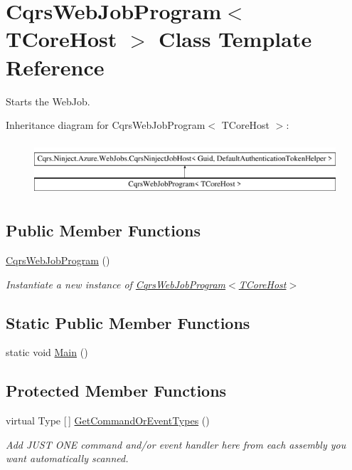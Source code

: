 \hypertarget{classCqrsWebJobProgram}{}\section{Cqrs\+Web\+Job\+Program$<$ T\+Core\+Host $>$ Class Template Reference}
\label{classCqrsWebJobProgram}


Starts the Web\+Job.  


Inheritance diagram for Cqrs\+Web\+Job\+Program$<$ T\+Core\+Host $>$\+:\begin{figure}[H]
\begin{center}
\leavevmode
\includegraphics[height=2.000000cm]{classCqrsWebJobProgram}
\end{center}
\end{figure}
\subsection*{Public Member Functions}
\begin{DoxyCompactItemize}
\item 
\hyperlink{classCqrsWebJobProgram_a7a7e74a9c2358374e3627abb36bd4462_a7a7e74a9c2358374e3627abb36bd4462}{Cqrs\+Web\+Job\+Program} ()
\begin{DoxyCompactList}\small\item\em Instantiate a new instance of \hyperlink{classCqrsWebJobProgram_a7a7e74a9c2358374e3627abb36bd4462_a7a7e74a9c2358374e3627abb36bd4462}{Cqrs\+Web\+Job\+Program$<$\+T\+Core\+Host$>$} \end{DoxyCompactList}\end{DoxyCompactItemize}
\subsection*{Static Public Member Functions}
\begin{DoxyCompactItemize}
\item 
static void \hyperlink{classCqrsWebJobProgram_ae6a4d96517a362a031ec60c171501543_ae6a4d96517a362a031ec60c171501543}{Main} ()
\end{DoxyCompactItemize}
\subsection*{Protected Member Functions}
\begin{DoxyCompactItemize}
\item 
virtual Type \mbox{[}$\,$\mbox{]} \hyperlink{classCqrsWebJobProgram_a07e42c1b43cb95a6d997a80a6a6c0a47_a07e42c1b43cb95a6d997a80a6a6c0a47}{Get\+Command\+Or\+Event\+Types} ()
\begin{DoxyCompactList}\small\item\em Add J\+U\+ST O\+NE command and/or event handler here from each assembly you want automatically scanned. \end{DoxyCompactList}\end{DoxyCompactItemize}
